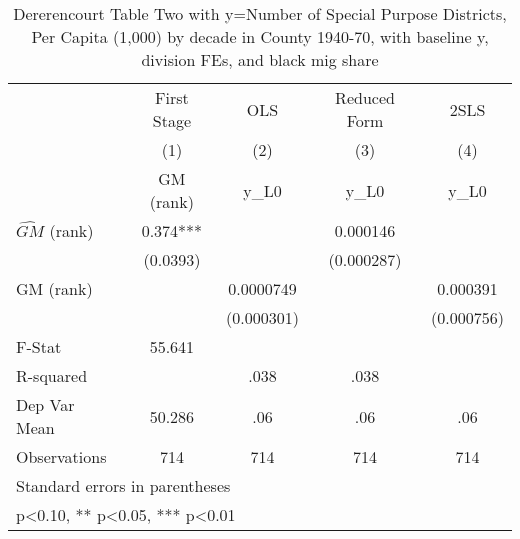 \begin{table}[htbp]\centering
\def\sym#1{\ifmmode^{#1}\else\(^{#1}\)\fi}
\caption{Dererencourt Table Two with y=Number of Special Purpose Districts, Per Capita (1,000) by decade in County 1940-70, with baseline y, division FEs, and black mig share}
\begin{tabular}{l*{4}{c}}
\toprule
                    & First Stage   &         OLS   &Reduced Form   &        2SLS   \\
                    &\multicolumn{1}{c}{(1)}&\multicolumn{1}{c}{(2)}&\multicolumn{1}{c}{(3)}&\multicolumn{1}{c}{(4)}\\
                    &\multicolumn{1}{c}{GM  (rank)}&\multicolumn{1}{c}{y\_L0}&\multicolumn{1}{c}{y\_L0}&\multicolumn{1}{c}{y\_L0}\\
\midrule
$\hat{GM}$ (rank)   &       0.374***&               &    0.000146   &               \\
                    &    (0.0393)   &               &  (0.000287)   &               \\
\addlinespace
GM  (rank)          &               &   0.0000749   &               &    0.000391   \\
                    &               &  (0.000301)   &               &  (0.000756)   \\
\midrule
F-Stat              &      55.641   &               &               &               \\
R-squared           &               &        .038   &        .038   &               \\
Dep Var Mean        &      50.286   &         .06   &         .06   &         .06   \\
Observations        &         714   &         714   &         714   &         714   \\
\bottomrule
\multicolumn{5}{l}{\footnotesize Standard errors in parentheses}\\
\multicolumn{5}{l}{\footnotesize * p<0.10, ** p<0.05, *** p<0.01}\\
\end{tabular}
\end{table}
